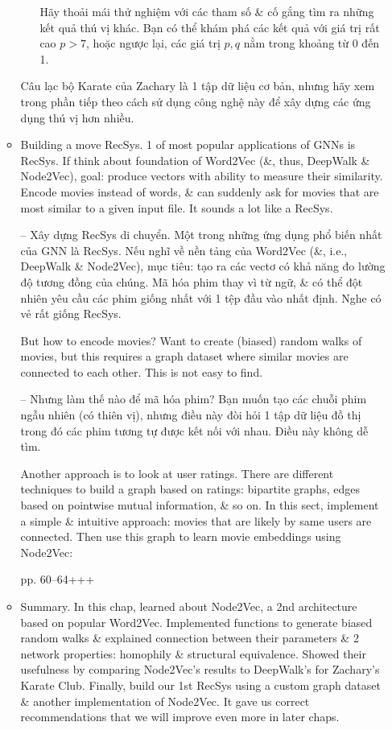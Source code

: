 \documentclass{article}
\begin{document}
\begin{itemize}
\begin{itemize}
\begin{itemize}
            Hãy thoải mái thử nghiệm với các tham số \& cố gắng tìm ra những kết quả thú vị khác. Bạn có thể khám phá các kết quả với giá trị rất cao $p > 7$, hoặc ngược lại, các giá trị $p,q$ nằm trong khoảng từ 0 đến 1.
        \end{itemize}
        Câu lạc bộ Karate của Zachary là 1 tập dữ liệu cơ bản, nhưng hãy xem trong phần tiếp theo cách sử dụng công nghệ này để xây dựng các ứng dụng thú vị hơn nhiều.
        \item {\sf Building a move RecSys.} 1 of most popular applications of GNNs is RecSys. If think about foundation of Word2Vec (\&, thus, DeepWalk \& Node2Vec), goal: produce vectors with ability to measure their similarity. Encode movies instead of words, \& can suddenly ask for movies that are most similar to a given input file. It sounds a lot like a RecSys.

        -- {\sf Xây dựng RecSys di chuyển.} Một trong những ứng dụng phổ biến nhất của GNN là RecSys. Nếu nghĩ về nền tảng của Word2Vec (\&, i.e., DeepWalk \& Node2Vec), mục tiêu: tạo ra các vectơ có khả năng đo lường độ tương đồng của chúng. Mã hóa phim thay vì từ ngữ, \& có thể đột nhiên yêu cầu các phim giống nhất với 1 tệp đầu vào nhất định. Nghe có vẻ rất giống RecSys.

        But how to encode movies? Want to create (biased) random walks of movies, but this requires a graph dataset where similar movies are connected to each other. This is not easy to find.

        -- Nhưng làm thế nào để mã hóa phim? Bạn muốn tạo các chuỗi phim ngẫu nhiên (có thiên vị), nhưng điều này đòi hỏi 1 tập dữ liệu đồ thị trong đó các phim tương tự được kết nối với nhau. Điều này không dễ tìm.

        Another approach is to look at user ratings. There are different techniques to build a graph based on ratings: bipartite graphs, edges based on pointwise mutual information, \& so on. In this sect, implement a simple \& intuitive approach: movies that are likely by same users are connected. Then use this graph to learn movie embeddings using Node2Vec:

        pp. 60--64+++
        \item {\sf Summary.} In this chap, learned about Node2Vec, a 2nd architecture based on popular Word2Vec. Implemented functions to generate biased random walks \& explained connection between their parameters \& 2 network properties: homophily \& structural equivalence. Showed their usefulness by comparing Node2Vec's results to DeepWalk's for Zachary's Karate Club. Finally, build our 1st RecSys using a custom graph dataset \& another implementation of Node2Vec. It gave us correct recommendations that we will improve even more in later chaps.


\end{itemize}
\end{itemize}
\end{document}
